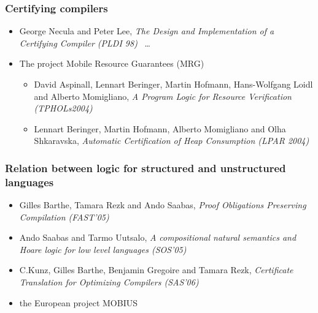 \documentclass{beamer}
\begin{document}
\begin{frame}[shrink]\frametitle{ Certifying compilers} 
 \begin{itemize}
      \item George Necula and Peter Lee,\textit{ The Design and Implementation of a Certifying Compiler (PLDI 98)} \
	\ldots
      \item  The  project Mobile Resource Guarantees (MRG) 
      \begin{itemize}
             \item David Aspinall, Lennart Beringer, Martin Hofmann, Hans-Wolfgang Loidl and Alberto Momigliano, 
              \textit{A Program Logic for Resource Verification (TPHOLs2004)}
              \item Lennart Beringer, Martin Hofmann, Alberto Momigliano and Olha Shkaravska,
           \textit{Automatic Certification of Heap Consumption (LPAR 2004)} 
        \end{itemize}
 \end{itemize}
\end{frame}

    \begin{frame}[shrink]\frametitle{Relation between logic for structured and unstructured languages}
 \begin{itemize}   
      \item Gilles Barthe, Tamara Rezk  and Ando Saabas, \textit{ Proof Obligations Preserving Compilation (FAST'05)}
	\item Ando  Saabas and Tarmo Uutsalo, \textit{A compositional natural semantics and Hoare logic for low level languages (SOS'05)}
        \item  C.Kunz, Gilles Barthe, Benjamin Gregoire and Tamara Rezk,  \textit{ Certificate Translation for Optimizing Compilers (SAS'06) }
          \item the European project MOBIUS 
 \end{itemize}
\end{frame}
\end{document}
